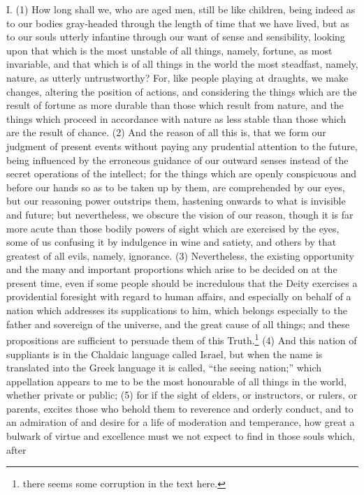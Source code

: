 I. (1) How long shall we, who are aged men, still be like children, being indeed as to our bodies
gray-headed through the length of time that we have lived, but as to our souls utterly infantine
through our want of sense and sensibility, looking upon that which is the most unstable of all things,
namely, fortune, as most invariable, and that which is of all things in the world the most steadfast,
namely, nature, as utterly untrustworthy? For, like people playing at draughts, we make changes,
altering the position of actions, and considering the things which are the result of fortune as more
durable than those which result from nature, and the things which proceed in accordance with
nature as less stable than those which are the result of chance. (2) And the reason of all this is,
that we form our judgment of present events without paying any prudential attention to the future,
being influenced by the erroneous guidance of our outward senses instead of the secret
operations of the intellect; for the things which are openly conspicuous and before our hands so as
to be taken up by them, are comprehended by our eyes, but our reasoning power outstrips them,
hastening onwards to what is invisible and future; but nevertheless, we obscure the vision of our
reason, though it is far more acute than those bodily powers of sight which are exercised by the
eyes, some of us confusing it by indulgence in wine and satiety, and others by that greatest of all
evils, namely, ignorance. (3) Nevertheless, the existing opportunity and the many and important
proportions which arise to be decided on at the present time, even if some people should be
incredulous that the Deity exercises a providential foresight with regard to human affairs, and
especially on behalf of a nation which addresses its supplications to him, which belongs especially
to the father and sovereign of the universe, and the great cause of all things; and these
propositions are sufficient to persuade them of this Truth.\footnote{there seems some corruption in the text here.}
(4) And this nation of suppliants is in the Chaldaic language called Israel, but when the name is
translated into the Greek language it is called, ``the seeing nation;'' which appellation appears to me
to be the most honourable of all things in the world, whether private or public; (5) for if the sight of
elders, or instructors, or rulers, or parents, excites those who behold them to reverence and
orderly conduct, and to an admiration of and desire for a life of moderation and temperance, how
great a bulwark of virtue and excellence must we not expect to find in those souls which, after
